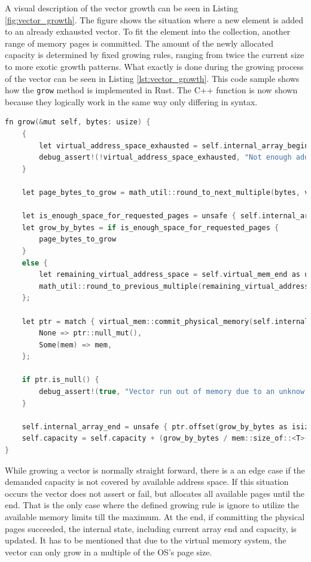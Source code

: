 \noindent
A visual description of the vector growth can be seen in Listing \ref{fig:vector_growth}. The figure shows the situation where a new element is added to an already exhausted vector. To fit the element into the collection, another range of memory pages is committed. The amount of the newly allocated capacity is determined by fixed growing rules, ranging from twice the current size to more exotic growth patterns. What exactly is done during the growing process of the vector can be seen in Listing \ref{lst:vector_growth}. This code sample shows how the \texttt{grow} method is implemented in Rust. The C++ function is now shown because they logically work in the same way only differing in syntax.\\

\begin{lstlisting}[caption={Growth function of the Spark vector in Rust.}, label={lst:vector_growth}, language={C++}]
fn grow(&mut self, bytes: usize) {
	{
		let virtual_address_space_exhausted = self.internal_array_begin.as_ptr() as *mut u8 == self.virtual_mem_end;
		debug_assert!(!virtual_address_space_exhausted, "Not enough address space to grow further");
	}
	
	let page_bytes_to_grow = math_util::round_to_next_multiple(bytes, virtual_mem::get_page_size());
	
	let is_enough_space_for_requested_pages = unsafe { self.internal_array_end.offset(page_bytes_to_grow as isize) <= self.virtual_mem_end };
	let grow_by_bytes = if is_enough_space_for_requested_pages {
		page_bytes_to_grow
	}
	else {
		let remaining_virtual_address_space = self.virtual_mem_end as usize - self.internal_array_end as usize;
		math_util::round_to_previous_multiple(remaining_virtual_address_space, virtual_mem::get_page_size())
	};
	
	let ptr = match { virtual_mem::commit_physical_memory(self.internal_array_end, grow_by_bytes) } {
		None => ptr::null_mut(),
		Some(mem) => mem,
	};
	
	if ptr.is_null() {
		debug_assert!(true, "Vector run out of memory due to an unknow error");
	}
	
	self.internal_array_end = unsafe { ptr.offset(grow_by_bytes as isize) };
	self.capacity = self.capacity + (grow_by_bytes / mem::size_of::<T>());
}
\end{lstlisting}

\noindent
While growing a vector is normally straight forward, there is a an edge case if the demanded capacity is not covered by available address space. If this situation occurs the vector does not assert or fail, but allocates all available pages until the end. That is the only case where the defined growing rule is ignore to utilize the available memory limits till the maximum. At the end, if committing the physical pages succeeded, the internal state, including current array end and capacity, is updated. It has to be mentioned that due to the virtual memory system, the vector can only grow in a multiple of the \ac{OS}'s page size.

